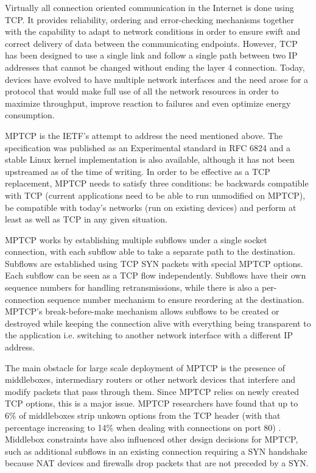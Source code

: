
Virtually all connection oriented communication in the Internet is done using TCP. It provides reliability, ordering and error-checking mechanisms together with the capability to adapt to network conditions in order to ensure swift and correct delivery of data between the communicating endpoints. However, TCP has been designed to use a single link and follow a single path between two IP addresses that cannot be changed without ending the layer 4 connection. Today, devices have evolved to have multiple network interfaces and the need arose for a protocol that would make full use of all the network resources in order to maximize throughput, improve reaction to failures and even optimize energy consumption.

MPTCP is the IETF's attempt to address the need mentioned above. The specification was published as an Experimental standard in RFC 6824 and a stable Linux kernel implementation is also available, although it has not been upstreamed as of the time of writing. In order to be effective as a TCP replacement, MPTCP needs to satisfy three conditions: be backwards compatible with TCP (current applications need to be able to run unmodified on MPTCP), be compatible with today's networks (run on existing devices) and perform at least as well as TCP in any given situation.

MPTCP works by establishing multiple subflows under a single socket connection, with each subflow able to take a separate path to the destination. Subflows are established using TCP SYN packets with special MPTCP options. Each subflow can be seen as a TCP flow independently. Subflows have their own sequence numbers for handling retransmissions, while there is also a per-connection sequence number mechanism to ensure reordering at the destination. MPTCP's break-before-make mechanism allows subflows to be created or destroyed while keeping the connection alive with everything being transparent to the application i.e. switching to another network interface with a different IP address.

The main obstacle for large scale deployment of MPTCP is the presence of
middleboxes, intermediary routers or other network devices that interfere and
modify packets that pass through them. Since MPTCP relies on newly created TCP
options, this is a major issue. MPTCP researchers have found that up to 6\% of
middleboxes strip unkown options from the TCP header (with that percentage
increasing to 14\% when dealing with connections on port 80)
\cite{how-hard-can-it-be}. Middlebox constraints have also influenced other
design decisions for MPTCP, such as additional subflows in an existing
connection requiring a SYN handshake because NAT devices and firewalls drop
packets that are not preceded by a SYN.


